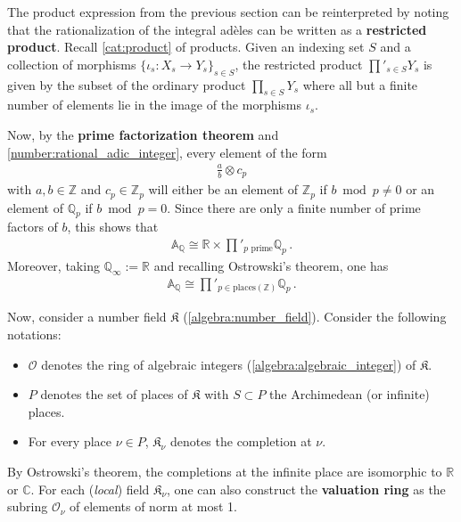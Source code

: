     The product expression from the previous section can be reinterpreted by noting that the rationalization of the integral ad\`eles can be written as a \textbf{restricted product}. Recall \cref{cat:product} of products. Given an indexing set $S$ and a collection of morphisms $\{\iota_s:X_s\rightarrow Y_s\}_{s\in S}$, the restricted product $\prod'_{s\in S}Y_s$ is given by the subset of the ordinary product $\prod_{s\in S}Y_s$ where all but a finite number of elements lie in the image of the morphisms $\iota_s$.

    Now, by the \textbf{prime factorization theorem} and \cref{number:rational_adic_integer}, every element of the form
    \begin{gather}
        \frac{a}{b}\otimes c_p
    \end{gather}
    with $a,b\in\mathbb{Z}$ and $c_p\in\mathbb{Z}_p$ will either be an element of $\mathbb{Z}_p$ if $b\bmod p\neq0$ or an element of $\mathbb{Q}_p$ if $b\bmod p=0$. Since there are only a finite number of prime factors of $b$, this shows that
    \begin{gather}
        \mathbb{A}_{\mathbb{Q}}\cong\mathbb{R}\times\prod'_{p\text{ prime}}\mathbb{Q}_p\,.
    \end{gather}
    Moreover, taking $\mathbb{Q}_\infty:=\mathbb{R}$ and recalling Ostrowski's theorem, one has
    \begin{gather}
        \mathbb{A}_{\mathbb{Q}}\cong\prod'_{p\in\mathrm{places}(\mathbb{Z})}\mathbb{Q}_p\,.
    \end{gather}

    Now, consider a number field $\mathfrak{K}$ (\cref{algebra:number_field}). Consider the following notations:
    \begin{itemize}
        \item $\mathcal{O}$ denotes the ring of algebraic integers (\cref{algebra:algebraic_integer}) of $\mathfrak{K}$.
        \item $P$ denotes the set of places of $\mathfrak{K}$ with $S\subset P$ the Archimedean (or infinite) places.
        \item For every place $\nu\in P$, $\mathfrak{K}_\nu$ denotes the completion at $\nu$.
    \end{itemize}
    By Ostrowski's theorem, the completions at the infinite place are isomorphic to $\mathbb{R}$ or $\mathbb{C}$. For each (\textit{local}) field $\mathfrak{K}_\nu$, one can also construct the \textbf{valuation ring} as the subring $\mathcal{O}_\nu$ of elements of norm at most 1.

